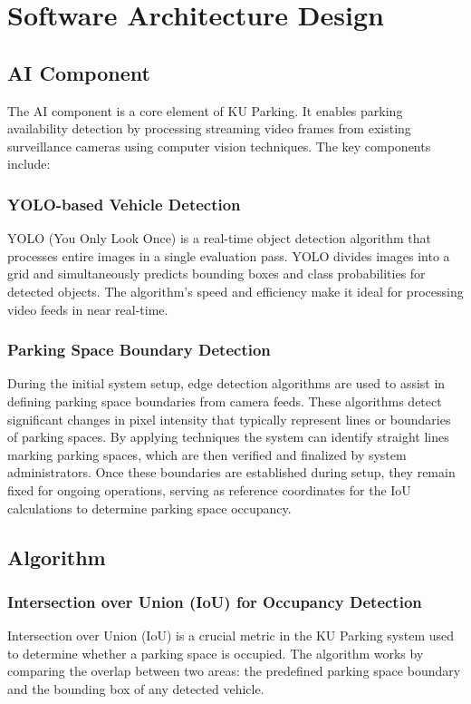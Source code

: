 \chapter{Software Architecture Design}

\section{AI Component}
\label{section:ai-component}

The AI component is a core element of KU Parking. 
It enables parking availability detection by processing streaming video frames from existing surveillance cameras using computer vision techniques. 
The key components include:

\subsection{YOLO-based Vehicle Detection}
YOLO (You Only Look Once) is a real-time object detection algorithm that processes entire images in a single evaluation pass.
YOLO divides images into a grid and simultaneously predicts bounding boxes and class probabilities for detected objects. 
The algorithm's speed and efficiency make it ideal for processing video feeds in near real-time.

\subsection{Parking Space Boundary Detection}
During the initial system setup, edge detection algorithms are used to assist in defining parking space boundaries from camera feeds. 
These algorithms detect significant changes in pixel intensity that typically represent lines or boundaries of parking spaces. 
By applying techniques the system can identify straight lines marking parking spaces, 
which are then verified and finalized by system administrators. Once these boundaries are established during setup, 
they remain fixed for ongoing operations, serving as reference coordinates for the IoU calculations to determine parking space occupancy.


\section{Algorithm}
\label{section:algorithm}
\subsection{Intersection over Union (IoU) for Occupancy Detection}
Intersection over Union (IoU) is a crucial metric in the KU Parking system used to determine whether a parking space is occupied. 
The algorithm works by comparing the overlap between two areas: the predefined parking space boundary and the bounding box of any detected vehicle.

